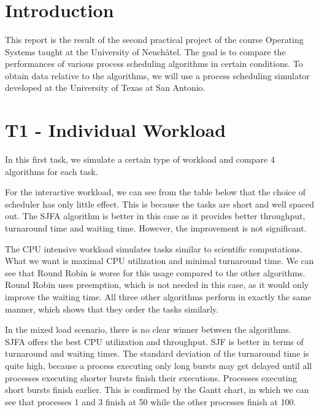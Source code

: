 \documentclass[11pt,a4paper]{scrartcl}
\author{\myauthor}
\title{\huge \textbf{\mytitle}}
\begin{document}
\maketitle

\section*{Introduction}

This report is the result of the second practical project of the course Operating Systems taught at the University of Neuchâtel. The goal is to compare the performances of various process scheduling algorithms in certain conditions. To obtain data relative to the algorithms, we will use a process scheduling simulator developed at the University of Texas at San Antonio.

\section*{T1 - Individual Workload}

In this first task, we simulate a certain type of workload and compare 4 algorithms for each task.

For the interactive workload, we can see from the table below that the choice of scheduler has only little effect. This is because the tasks are short and well spaced out. The SJFA algorithm is better in this case as it provides better throughput, turnaround time and waiting time. However, the improvement is not significant.

The CPU intensive workload simulates tasks similar to scientific computations. What we want is maximal CPU utilization and minimal turnaround time. We can see that Round Robin is worse for this usage compared to the other algorithms. Round Robin uses preemption, which is not needed in this case, as it would only improve the waiting time. All three other algorithms perform in exactly the same manner, which shows that they order the tasks similarly.

In the mixed load scenario, there is no clear winner between the algorithms. SJFA offers the best CPU utilization and throughput. SJF is better in terms of turnaround and waiting times. The standard deviation of the turnaround time is quite high, because a process executing only long bursts may get delayed until all processes executing shorter bursts finish their executions. Processes executing short bursts finish earlier. This is confirmed by the Gantt chart, in which we can see that processes 1 and 3 finish at 50 while the other processes finish at 100.
\end{document}
